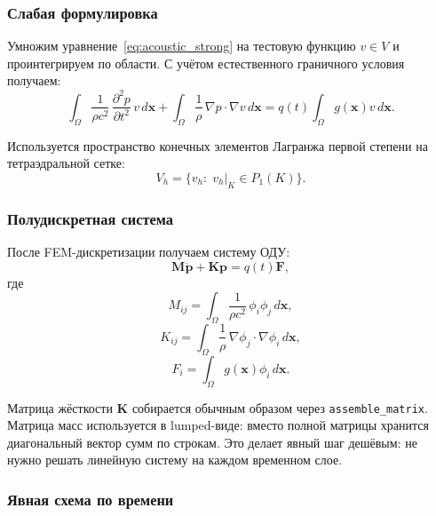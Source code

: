 \subsubsection{Слабая формулировка}

Умножим уравнение~\eqref{eq:acoustic_strong} на тестовую функцию
$v \in V$ и проинтегрируем по области. С учётом естественного
граничного условия получаем:
\begin{equation}\label{eq:acoustic_weak}
  \int_\Omega
  \frac{1}{\rho c^2}\,
  \frac{\partial^2 p}{\partial t^2}\,v\,d\mathbf{x}
  +
  \int_\Omega
  \frac{1}{\rho}\,\nabla p\cdot\nabla v\,d\mathbf{x}
  =
  q(t)\int_\Omega g(\mathbf{x})v\,d\mathbf{x}.
\end{equation}

Используется пространство конечных элементов Лагранжа первой степени
на тетраэдральной сетке:
\[
  V_h = \{v_h:\; v_h|_K \in P_1(K)\}.
\]


\subsubsection{Полудискретная система}

После FEM-дискретизации получаем систему ОДУ:
\begin{equation}\label{eq:semi_discrete}
  \mathbf{M}\ddot{\mathbf{p}} + \mathbf{K}\mathbf{p}
  = q(t)\mathbf{F},
\end{equation}
где
\begin{equation}
  M_{ij} = \int_\Omega
  \frac{1}{\rho c^2}\,\phi_i\phi_j\,d\mathbf{x},
\end{equation}
\begin{equation}
  K_{ij} = \int_\Omega
  \frac{1}{\rho}\,\nabla\phi_j\cdot\nabla\phi_i\,d\mathbf{x},
\end{equation}
\begin{equation}
  F_i = \int_\Omega g(\mathbf{x})\phi_i\,d\mathbf{x}.
\end{equation}

Матрица жёсткости $\mathbf{K}$ собирается обычным образом через
\texttt{assemble\_matrix}. Матрица масс используется в lumped-виде:
вместо полной матрицы хранится диагональный вектор сумм по строкам.
Это делает явный шаг дешёвым: не нужно решать линейную систему на
каждом временном слое.

\subsubsection{Явная схема по времени}

